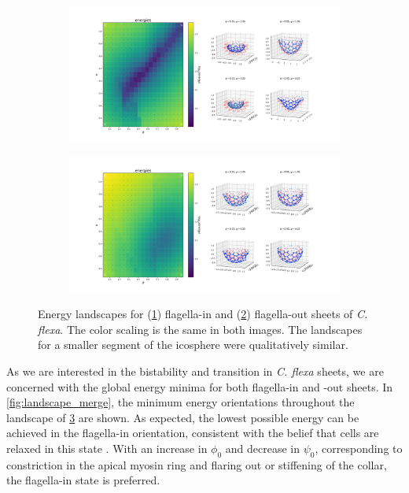 \begin{figure}
	\centering
	\begin{subfigure}[b]{\textwidth}
		\centering
		\includegraphics[width=\textwidth]{landscape_ico3.png}
		\caption{}
		\label{subfig:landscape_ico}
	\end{subfigure}
	\begin{subfigure}[b]{\textwidth}
		\centering
		\includegraphics[width=\textwidth]{landscape_ico3r.png}
		\caption{}
		\label{subfig:landscape_icor}
	\end{subfigure}
	\caption[Energy landscape for flagella-in and flagella-out curved sheets]{Energy landscapes for (\ref{subfig:landscape_ico}) flagella-in and (\ref{subfig:landscape_icor}) flagella-out sheets of \textit{C. flexa}. The color scaling is the same in both images. The landscapes for a smaller segment of the icosphere were qualitatively similar.}
	\label{fig:landscape_ico}
\end{figure}

As we are interested in the bistability and transition in \textit{C. flexa} sheets, we are concerned with the global energy minima for both flagella-in and -out sheets. In \cref{fig:landscape_merge}, the minimum energy orientations throughout the landscape of \cref{fig:landscape_ico} are shown. 
As expected, the lowest possible energy can be achieved in the flagella-in orientation, consistent with the belief that cells are relaxed in this state \citep{brunet2019}.
With an increase in $\phi_0$ and decrease in $\psi_0$, corresponding to constriction in the apical myosin ring and flaring out or stiffening of the collar, the flagella-in state is preferred. 

